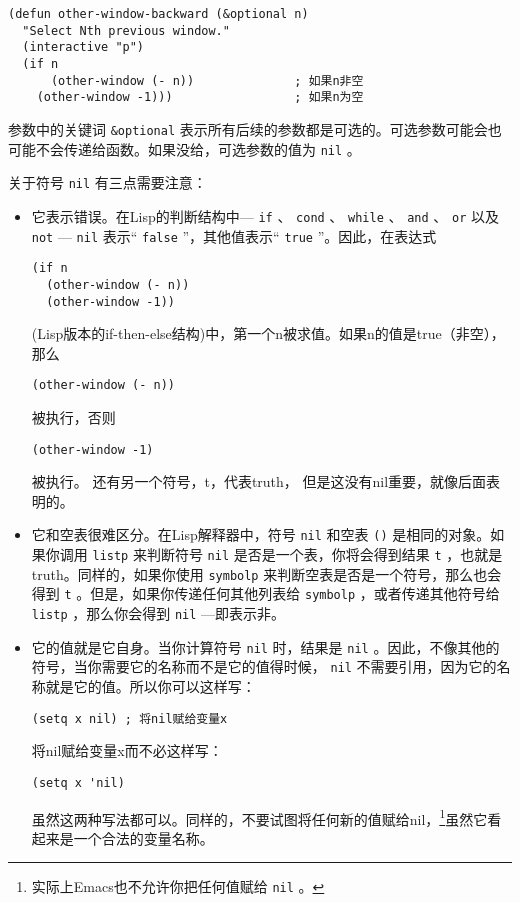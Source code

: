 \begin{verbatim}
(defun other-window-backward (&optional n)
  "Select Nth previous window."
  (interactive "p")
  (if n
      (other-window (- n))              ; 如果n非空
    (other-window -1)))                 ; 如果n为空
\end{verbatim}

参数中的关键词 \texttt{&optional} 表示所有后续的参数都是可选的。可选参数可能会也可能不会传递给函数。如果没给，可选参数的值为 \texttt{nil} 。

关于符号 \texttt{nil} 有三点需要注意：

\begin{itemize}
  \item 它表示错误。在Lisp的判断结构中--- \texttt{if} 、 \texttt{cond} 、 \texttt{while} 、 \texttt{and} 、 \texttt{or} 以及 \texttt{not} --- \texttt{nil} 表示“ \texttt{false} ”，其他值表示“ \texttt{true} ”。因此，在表达式
\begin{verbatim}
(if n
  (other-window (- n))
  (other-window -1))
\end{verbatim}
(Lisp版本的if-then-else结构)中，第一个n被求值。如果n的值是true（非空），那么
\begin{verbatim}
(other-window (- n))
\end{verbatim}
被执行，否则
\begin{verbatim}
(other-window -1)
\end{verbatim}
被执行。
还有另一个符号，t，代表truth， 但是这没有nil重要，就像后面表明的。
  \item 它和空表很难区分。在Lisp解释器中，符号 \texttt{nil} 和空表 \texttt{()} 是相同的对象。如果你调用 \texttt{listp} 来判断符号 \texttt{nil} 是否是一个表，你将会得到结果 \texttt{t} ，也就是truth。同样的，如果你使用 \texttt{symbolp} 来判断空表是否是一个符号，那么也会得到 \texttt{t} 。但是，如果你传递任何其他列表给 \texttt{symbolp} ，或者传递其他符号给 \texttt{listp} ，那么你会得到 \texttt{nil} ---即表示非。
  \item 它的值就是它自身。当你计算符号 \texttt{nil} 时，结果是 \texttt{nil} 。因此，不像其他的符号，当你需要它的名称而不是它的值得时候， \texttt{nil} 不需要引用，因为它的名称就是它的值。所以你可以这样写：
\begin{verbatim}
(setq x nil) ; 将nil赋给变量x
\end{verbatim}
将nil赋给变量x而不必这样写：
\begin{verbatim}
(setq x 'nil)
\end{verbatim}
虽然这两种写法都可以。同样的，不要试图将任何新的值赋给nil，\footnote{实际上Emacs也不允许你把任何值赋给 \texttt{nil} 。}虽然它看起来是一个合法的变量名称。
\end{itemize}

